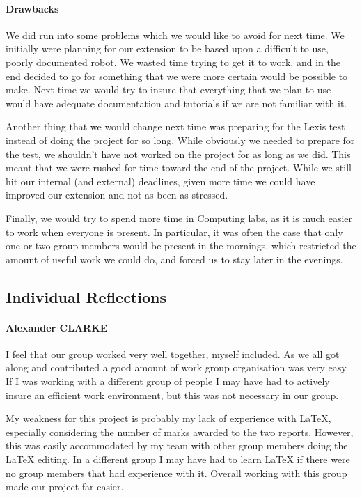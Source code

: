 \documentclass[10pt]{article}
\begin{document}
\paragraph{Drawbacks}
We did run into some problems which we would like to avoid for next time. We initially were planning for our extension to be based upon a difficult to use, poorly documented robot. We wasted time trying to get it to work, and in the end decided to go for something that we were more certain would be possible to make. Next time we would try to insure that everything that we plan to use would have adequate documentation and tutorials if we are not familiar with it.

Another thing that we would change next time was preparing for the Lexis test instead of doing the project for so long. While obviously we needed to prepare for the test, we shouldn’t have not worked on the project for as long as we did. This meant that we were rushed for time toward the end of the project. While we still hit our internal (and external) deadlines, given more time we could have improved our extension and not as been as stressed.

Finally, we would try to spend more time in Computing labs, as it is much easier to work when everyone is present. In particular, it was often the case that only one or two group members would be present in the mornings, which restricted the amount of useful work we could do, and forced us to stay later in the evenings.

\subsection{Individual Reflections}

\paragraph{Alexander CLARKE}
I feel that our group worked very well together, myself included. As we all got along and contributed a good amount of work group organisation was very easy. If I was working with a different group of people I may have had to actively insure an efficient work environment, but this was not necessary in our group. 

My weakness for this project is probably my lack of experience with LaTeX, especially considering the number of marks awarded to the two reports. However, this was easily accommodated by my team with other group members doing the LaTeX editing. In a different group I may have had to learn LaTeX if there were no group members that had experience with it. Overall working with this group made our project far easier.
\end{document}
